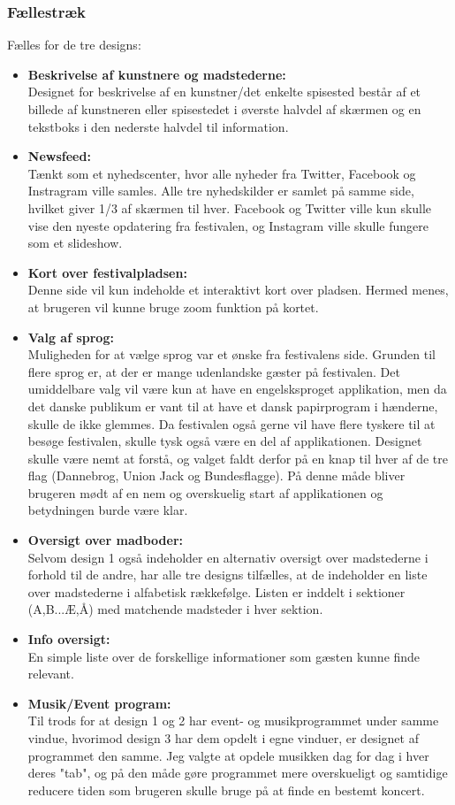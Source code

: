 \documentclass[a4paper,10pt,titlepage]{article}
\begin{document}
\subsubsection{Fællestræk}
Fælles for de tre designs:
\begin{itemize}
\item
\textbf{Beskrivelse af kunstnere og madstederne:}\\ Designet for beskrivelse af en kunstner/det enkelte spisested  består af et billede af kunstneren eller spisestedet i øverste halvdel af skærmen og en tekstboks i den nederste halvdel til information.
\item
\textbf{Newsfeed:}\\ Tænkt som et nyhedscenter, hvor alle nyheder fra Twitter, Facebook og Instragram ville samles. Alle tre nyhedskilder er samlet på samme side, hvilket giver 1/3 af skærmen til hver. Facebook og Twitter ville kun skulle vise den nyeste opdatering fra festivalen, og Instagram ville skulle fungere som et slideshow.
\item
\textbf{Kort over festivalpladsen:}\\ Denne side vil kun indeholde et interaktivt kort over pladsen. Hermed menes, at brugeren vil kunne bruge zoom funktion på kortet.
\item
\textbf{Valg af sprog:}\\ Muligheden for at vælge sprog var et ønske fra festivalens side. Grunden til flere sprog er, at der er mange udenlandske gæster på festivalen. Det umiddelbare valg vil være kun at have en engelsksproget applikation, men da det danske publikum er vant til at have et dansk papirprogram i hænderne, skulle de ikke glemmes. Da festivalen også gerne vil have flere tyskere til at besøge festivalen, skulle tysk også være en del af applikationen. Designet skulle være nemt at forstå, og valget faldt derfor på en knap til hver af de tre flag (Dannebrog, Union Jack og Bundesflagge). På denne måde bliver brugeren mødt af en nem og overskuelig start af applikationen og betydningen burde være klar.
\item
\textbf{Oversigt over madboder:}\\ Selvom design 1 også indeholder en alternativ oversigt over madstederne i forhold til de andre, har alle tre designs tilfælles, at de indeholder en liste over madstederne i alfabetisk rækkefølge. Listen er inddelt i sektioner (A,B...Æ,Å) med matchende madsteder i  hver sektion.
\item
\textbf{Info oversigt:}\\ En simple liste over de forskellige informationer som gæsten kunne finde relevant.
\item
\textbf{Musik/Event program:}\\ Til trods for at design 1 og 2 har event- og musikprogrammet under samme vindue, hvorimod design 3 har dem opdelt i egne vinduer, er designet af programmet den samme. Jeg valgte at opdele musikken dag for dag i hver deres "tab", og på den måde gøre programmet mere overskueligt og samtidige reducere tiden som brugeren skulle bruge på at finde en bestemt koncert.
\end{itemize}
\end{document}
